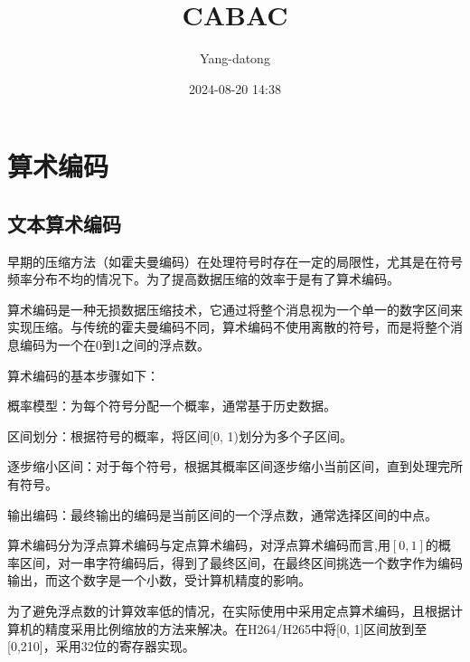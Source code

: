 \documentclass{/home/hi/Study/template/code}
\title{CABAC}
\author{\textcopyright Yang-datong }
\date{2024-08-20 14:38}
\begin{document}
\makehead


\section{算术编码}
\subsection{文本算术编码}
早期的压缩方法（如霍夫曼编码）在处理符号时存在一定的局限性，尤其是在符号频率分布不均的情况下。为了提高数据压缩的效率于是有了算术编码。

算术编码是一种无损数据压缩技术，它通过将整个消息视为一个单一的数字区间来实现压缩。与传统的霍夫曼编码不同，算术编码不使用离散的符号，而是将整个消息编码为一个在0到1之间的浮点数。

算术编码的基本步骤如下：
\begin{serialNumber}
	\item 概率模型：为每个符号分配一个概率，通常基于历史数据。
	\item 区间划分：根据符号的概率，将区间[0, 1)划分为多个子区间。
	\item 逐步缩小区间：对于每个符号，根据其概率区间逐步缩小当前区间，直到处理完所有符号。
	\item 输出编码：最终输出的编码是当前区间的一个浮点数，通常选择区间的中点。
\end{serialNumber}

算术编码分为浮点算术编码与定点算术编码，对浮点算术编码而言,用$[0, 1]$的概率区间，对一串字符编码后，得到了最终区间，在最终区间挑选一个数字作为编码输出，而这个数字是一个小数，受计算机精度的影响。
\begin{remark}
	为了避免浮点数的计算效率低的情况，在实际使用中采用定点算术编码，且根据计算机的精度采用比例缩放的方法来解决。在H264/H265中将[0, 1]区间放到至[0,210]，采用32位的寄存器实现。
\end{remark}
\end{document}
